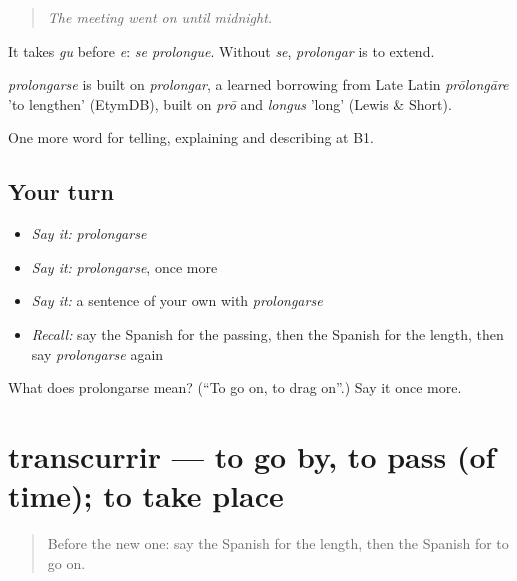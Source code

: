 \begin{quote}
\emph{The meeting went on until midnight.}
\end{quote}

It takes \emph{gu} before \emph{e}: \emph{se prolongue}. Without \emph{se}, \emph{prolongar} is to extend.

\begin{cousinweb}
\emph{prolongarse} is built on \emph{prolongar}, a learned borrowing from Late Latin \emph{prōlongāre} 'to lengthen' (EtymDB), built on \emph{prō} and \emph{longus} 'long' (Lewis \& Short).
\end{cousinweb}

\begin{grammarlens}[title={What you've built}]
One more word for telling, explaining and describing at B1.
\end{grammarlens}

\subsection*{Your turn}
\begin{itemize}
\raggedright
  \item \emph{Say it:} \emph{prolongarse}
  \item \emph{Say it:} \emph{prolongarse}, once more
  \item \emph{Say it:} a sentence of your own with \emph{prolongarse}
  \item \emph{Recall:} say the Spanish for the passing, then the Spanish for the length, then say \emph{prolongarse} again
\end{itemize}

\begin{tcolorbox}[breakable,colback=teal!4,colframe=teal!35!black,title={Before you move on}]
What does prolongarse mean? (\textquotedblleft{}To go on, to drag on\textquotedblright{}.) Say it once more.
\end{tcolorbox}
\section[transcurrir]{transcurrir — to go by, to pass (of time); to take place}

\label{lesson:ES-C541-transcurrir}



\begin{quote}
Before the new one: say the Spanish for the length, then the Spanish for to go on.
\end{quote}

